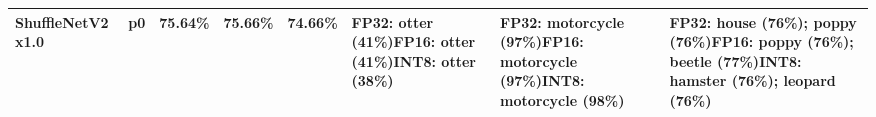 \begin{longtable}{p{2.8cm} r r r r p{5.0cm} p{4.2cm} p{4.2cm}}
ShuffleNetV2 x1.0 & p0 & 75.64\% & 75.66\% & 74.66\% & FP32: otter (41\%)\newline FP16: otter (41\%)\newline INT8: otter (38\%) & FP32: motorcycle (97\%)\newline FP16: motorcycle (97\%)\newline INT8: motorcycle (98\%) & FP32: house (76\%); poppy (76\%)\newline FP16: poppy (76\%); beetle (77\%)\newline INT8: hamster (76\%); leopard (76\%) \\ \hline
\end{longtable}
\endgroup
